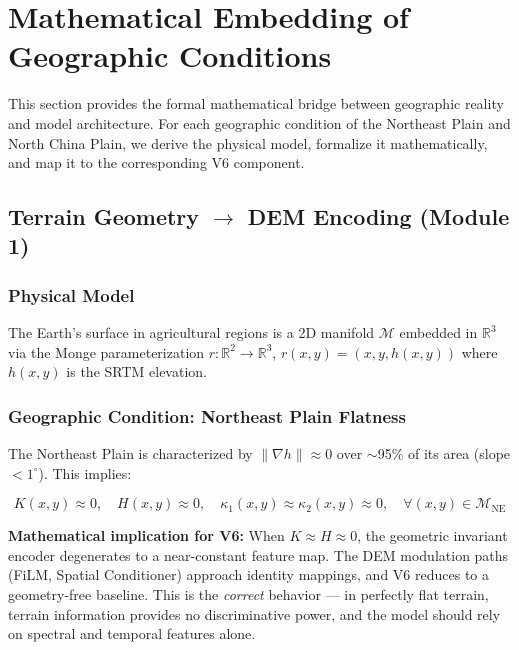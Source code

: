 \section{Mathematical Embedding of Geographic Conditions}

This section provides the formal mathematical bridge between geographic
reality and model architecture. For each geographic condition of the
Northeast Plain and North China Plain, we derive the physical model,
formalize it mathematically, and map it to the corresponding V6 component.

\subsection{Terrain Geometry $\to$ DEM Encoding (Module 1)}

\subsubsection{Physical Model}

The Earth's surface in agricultural regions is a 2D manifold $\mathcal{M}$
embedded in $\mathbb{R}^3$ via the Monge parameterization
$r: \mathbb{R}^2 \to \mathbb{R}^3$, $r(x,y) = (x, y, h(x,y))$ where
$h(x,y)$ is the SRTM elevation.

\subsubsection{Geographic Condition: Northeast Plain Flatness}

The Northeast Plain is characterized by $\|\nabla h\| \approx 0$ over
$\sim$95\% of its area (slope $<1^\circ$). This implies:

\begin{equation}\label{eq:ne-flatness}
    K(x,y) \approx 0, \quad H(x,y) \approx 0, \quad
    \kappa_1(x,y) \approx \kappa_2(x,y) \approx 0, \quad \forall (x,y) \in \mathcal{M}_{\text{NE}}
\end{equation}

\textbf{Mathematical implication for V6:} When $K \approx H \approx 0$, the
geometric invariant encoder degenerates to a near-constant feature map.
The DEM modulation paths (FiLM, Spatial Conditioner) approach identity
mappings, and V6 reduces to a geometry-free baseline. This is the
\textit{correct} behavior — in perfectly flat terrain, terrain information
provides no discriminative power, and the model should rely on spectral
and temporal features alone.

